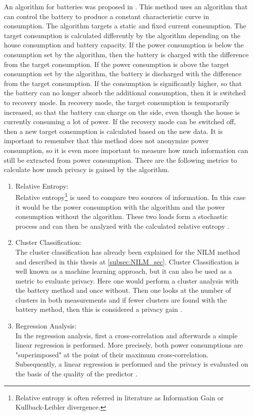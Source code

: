 An algorithm for batteries was proposed in \cite{mclaughlin2011protecting}. This method uses an algorithm that can control the battery to produce a constant characteristic curve in consumption. The algorithm targets a static and fixed current consumption. The target consumption is calculated differently by the algorithm depending on the house consumption and battery capacity. If the power consumption is below the consumption set by the algorithm, then the battery is charged with the difference from the target consumption. If the power consumption is above the target consumption set by the algorithm, the battery is discharged with the difference from the target consumption. If the consumption is significantly higher, so that the battery can no longer absorb the additional consumption, then it is switched to recovery mode. In recovery mode, the target consumption is temporarily increased, so that the battery can charge on the side, even though the house is currently consuming a lot of power. If the recovery mode can be switched off, then a new target consumption is calculated based on the new data. It is important to remember that this method does not anonymize power consumption, so it is even more important to measure how much information can still be extracted from power consumption. There are the following metrics to calculate how much privacy is gained by the algorithm.
\begin{enumerate}
\label{subsec:information_gain}
\item Relative Entropy:\\
Relative entropy\footnote[2]{Relative entropy is often referred in literature as Information Gain or Kullback-Leibler divergence.} is used to compare two sources of information. In this case it would be the power consumption with the algorithm and the power consumption without the algorithm. These two loads form a stochastic process and can then be analyzed with the calculated relative entropy \cite{kalogridis2011affordable}. 
\item Cluster Classification:\\
The cluster classification has already been explained for the NILM method and described in this thesis at \ref{subsec:NILM_sec}. Cluster Classification is well known as a machine learning approach, but it can also be used as a metric to evaluate privacy. Here one would perform a cluster analysis with the battery method and once without. Then one looks at the number of clusters in both measurements and if fewer clusters are found with the battery method, then this is considered a privacy gain \cite{kalogridis2010privacy}.
\item Regression Analysis:\\
In the regression analysis, first a cross-correlation and afterwards a simple linear regression is performed. More precisely, both power consumptions are "superimposed" at the point of their maximum cross-correlation. Subsequently, a linear regression is performed and the privacy is evaluated on the basis of the quality of the predictor \cite{mclaughlin2011protecting}.
\end{enumerate}
